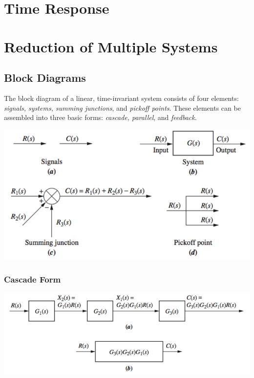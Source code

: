 \documentclass[11pt]{article}
\begin{document}
    \section{Time Response}
    
    \pagebreak

    
    \section{Reduction of Multiple Systems}

    \subsection{Block Diagrams}

    The block diagram of a linear, time-invariant system consists of four elements: \textit{signals, systems, summing junctions}, and \textit{pickoff points}. These elements can be assembled into three basic forms: \textit{cascade, parallel}, and \textit{feedback}.

    \begin{center}
        \includegraphics[width=300 px]{img/reduction} \\
    \end{center}

    \subsubsection{Cascade Form}

    \begin{center}
        \includegraphics[width=300 px]{img/cascade} \\
    \end{center}
\end{document}
